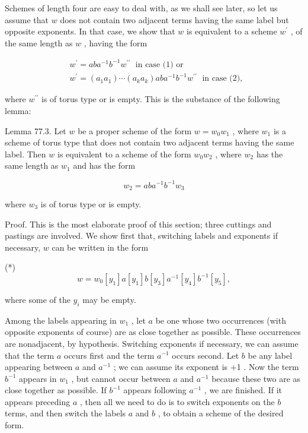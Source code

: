 Schemes of length four are easy to deal with, as we shall see later, so let us assume that \(w\) does not contain two adjacent terms having the same label but opposite exponents. In that case, we show that \(w\) is equivalent to a scheme \({w}^{\prime }\) , of the same length as \(w\) , having the form

\[
\begin{aligned}  & {w}^{\prime } = {ab}{a}^{-1}{b}^{-1}{w}^{\prime \prime }\;\text{ in case (1) or } \\  & {w}^{\prime } = \left( {{a}_{1}{a}_{1}}\right) \cdots \left( {{a}_{k}{a}_{k}}\right) {ab}{a}^{-1}{b}^{-1}{w}^{\prime \prime }\;\text{ in case (2), } \end{aligned}
\]

where \({w}^{\prime \prime }\) is of torus type or is empty. This is the substance of the following lemma:

Lemma 77.3. Let \(w\) be a proper scheme of the form \(w = {w}_{0}{w}_{1}\) , where \({w}_{1}\) is a scheme of torus type that does not contain two adjacent terms having the same label. Then \(w\) is equivalent to a scheme of the form \({w}_{0}{w}_{2}\) , where \({w}_{2}\) has the same length as \({w}_{1}\) and has the form

\[
{w}_{2} = {ab}{a}^{-1}{b}^{-1}{w}_{3}
\]

where \({w}_{3}\) is of torus type or is empty.

Proof. This is the most elaborate proof of this section; three cuttings and pastings are involved. We show first that, switching labels and exponents if necessary, \(w\) can be written in the form

(*)
\[
w = {w}_{0}\left\lbrack  {y}_{1}\right\rbrack  a\left\lbrack  {y}_{1}\right\rbrack  b\left\lbrack  {y}_{3}\right\rbrack  {a}^{-1}\left\lbrack  {y}_{4}\right\rbrack  {b}^{-1}\left\lbrack  {y}_{5}\right\rbrack  ,
\]

where some of the \({y}_{i}\) may be empty.

Among the labels appearing in \({w}_{1}\) , let \(a\) be one whose two occurrences (with opposite exponents of course) are as close together as possible. These occurrences are nonadjacent, by hypothesis. Switching exponents if necessary, we can assume that the term \(a\) occurs first and the term \({a}^{-1}\) occurs second. Let \(b\) be any label appearing between \(a\) and \({a}^{-1}\) ; we can assume its exponent is +1 . Now the term \({b}^{-1}\) appears in \({w}_{1}\) , but cannot occur between \(a\) and \({a}^{-1}\) because these two are as close together as possible. If \({b}^{-1}\) appears following \({a}^{-1}\) , we are finished. If it appears preceding \(a\) , then all we need to do is to switch exponents on the \(b\) terms, and then switch the labels \(a\) and \(b\) , to obtain a scheme of the desired form.

